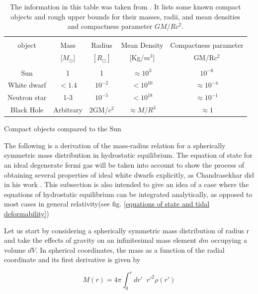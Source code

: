 \begin{table}[!htbp]
\begin{center}
\begin{tabular}{ccccc}
\hline\\
object &Mass&Radius& Mean Density& Compactness parameter \\
       & [$M_\odot$]& $[R_\odot]$& [Kg/$m^3$]& GM/R$c^2$  \\
\hline \\
Sun           &1          &1         &$\approx 10^{3}$   &$ 10^{-6}$ \\
White dwarf   &$< 1.4$ &$10^{-2}$    &$< 10^{10}$        &$\approx 10^{-4}$ \\
Neutron star  &1-3        &$10^{-5}$ &$< 10^{18}$        &$\approx 10^{-1}$ \\
Black Hole    &Arbitrary  &2GM/$c^2$ & $\approx M/R^{3}$ & $\approx 1$ \\
\hline
\end{tabular}
\captionsetup{width=.8\textwidth}
\caption{Compact objects compared to the Sun}
\caption*{The information in this table was taken from \cite{Shapiro:1983du}. It lists some known compact objects and rough upper bounds for their masses, radii, and mean densities and compactness parameter $GM/Rc^2$.}
\label{compactness}
\end{center}
\end{table}

The following is a derivation of the mass-radius relation for a spherically symmetric mass distribution in hydrostatic equilibrium. The equation of state for an ideal degenerate fermi gas will be taken into account to show the process of obtaining several properties of ideal white dwarfs explicitly, as Chandrasekhar did in his work \cite{Chandrasekhar:1931ih}. This subsection is also intended to give an idea of a case where the equations of hydrostatic equilibrium can be integrated analytically, as opposed to most cases in general relativity(see fig. \ref{equations of state and tidal deformability})

Let us start by considering a spherically symmetric mass distribution of radius r and take the effects of gravity on an infinitesimal mass element $dm$ occupying a volume $dV$. In spherical coordinates, the mass as a function of the radial coordinate and its first derivative is given by


\begin{equation}\label{mass}
M(r) = 4\pi  \int_0^{r} dr' \;\; r'^2 \rho(r') 
\end{equation}

